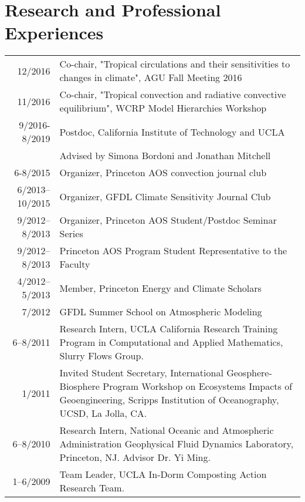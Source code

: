 \documentclass{article}
\begin{document}
\section*{Research and Professional Experiences}
\label{sec:orga5f73e8}
\begin{center}
\begin{tabularx}{\textwidth}{rX}
12/2016 & Co-chair, "Tropical circulations and their sensitivities to changes in climate", AGU Fall Meeting 2016\\
11/2016 & Co-chair, "Tropical convection and radiative convective equilibrium", WCRP Model Hierarchies Workshop\\
9/2016-8/2019 & Postdoc, California Institute of Technology and UCLA\\
 & Advised by Simona Bordoni and Jonathan Mitchell\\
6-8/2015 & Organizer, Princeton AOS convection journal club\\
6/2013–10/2015 & Organizer, GFDL Climate Sensitivity Journal Club\\
9/2012–8/2013 & Organizer, Princeton AOS Student/Postdoc Seminar Series\\
9/2012–8/2013 & Princeton AOS Program Student Representative to the Faculty\\
4/2012–5/2013 & Member, Princeton Energy and Climate Scholars\\
7/2012 & GFDL Summer School on Atmospheric Modeling\\
6–8/2011 & Research Intern, UCLA California Research Training Program in Computational and Applied Mathematics, Slurry Flows Group.\\
1/2011 & Invited Student Secretary, International Geosphere-Biosphere Program Workshop on Ecosystems Impacts of Geoengineering, Scripps Institution of Oceanography, UCSD, La Jolla, CA.\\
6–8/2010 & Research Intern, National Oceanic and Atmospheric Administration Geophysical Fluid Dynamics Laboratory, Princeton, NJ. Advisor Dr. Yi Ming.\\
1–6/2009 & Team Leader, UCLA In-Dorm Composting Action Research Team.\\
\end{tabularx}
\end{center}
\end{document}
